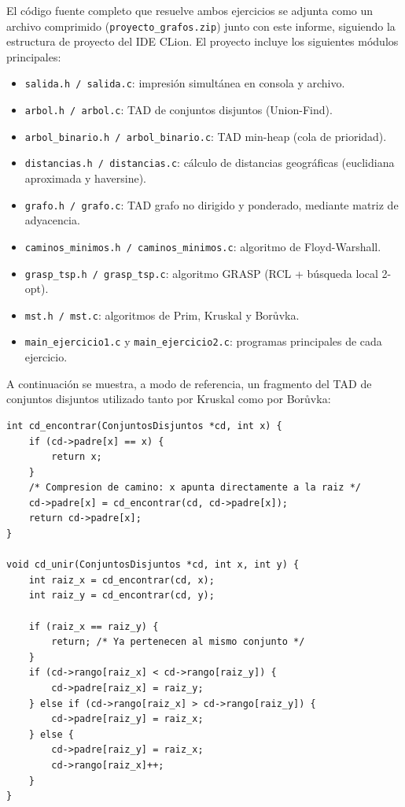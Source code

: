 \documentclass[12pt,letterpaper]{article}
\begin{document}
El código fuente completo que resuelve ambos ejercicios se adjunta como un archivo comprimido
(\texttt{proyecto\_grafos.zip}) junto con este informe, siguiendo la estructura de proyecto del
IDE CLion. El proyecto incluye los siguientes
módulos principales:

\begin{itemize}
    \item \texttt{salida.h / salida.c}: impresión simultánea en consola y archivo.
    \item \texttt{arbol.h / arbol.c}: TAD de conjuntos disjuntos (Union-Find).
    \item \texttt{arbol\_binario.h / arbol\_binario.c}: TAD min-heap (cola de prioridad).
    \item \texttt{distancias.h / distancias.c}: cálculo de distancias geográficas (euclidiana
    aproximada y haversine).
    \item \texttt{grafo.h / grafo.c}: TAD grafo no dirigido y ponderado, mediante matriz de
    adyacencia.
    \item \texttt{caminos\_minimos.h / caminos\_minimos.c}: algoritmo de Floyd-Warshall.
    \item \texttt{grasp\_tsp.h / grasp\_tsp.c}: algoritmo GRASP (RCL + búsqueda local 2-opt).
    \item \texttt{mst.h / mst.c}: algoritmos de Prim, Kruskal y Borůvka.
    \item \texttt{main\_ejercicio1.c} y \texttt{main\_ejercicio2.c}: programas principales de
    cada ejercicio.
\end{itemize}

A continuación se muestra, a modo de referencia, un fragmento del TAD de conjuntos disjuntos
utilizado tanto por Kruskal como por Borůvka:

\begin{lstlisting}[caption={Fragmento de arbol.c: union por rango con compresion de camino}]
int cd_encontrar(ConjuntosDisjuntos *cd, int x) {
    if (cd->padre[x] == x) {
        return x;
    }
    /* Compresion de camino: x apunta directamente a la raiz */
    cd->padre[x] = cd_encontrar(cd, cd->padre[x]);
    return cd->padre[x];
}

void cd_unir(ConjuntosDisjuntos *cd, int x, int y) {
    int raiz_x = cd_encontrar(cd, x);
    int raiz_y = cd_encontrar(cd, y);

    if (raiz_x == raiz_y) {
        return; /* Ya pertenecen al mismo conjunto */
    }
    if (cd->rango[raiz_x] < cd->rango[raiz_y]) {
        cd->padre[raiz_x] = raiz_y;
    } else if (cd->rango[raiz_x] > cd->rango[raiz_y]) {
        cd->padre[raiz_y] = raiz_x;
    } else {
        cd->padre[raiz_y] = raiz_x;
        cd->rango[raiz_x]++;
    }
}
\end{lstlisting}
\end{document}
